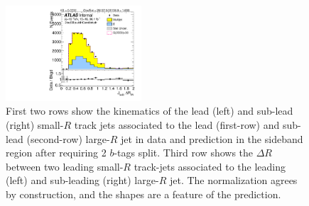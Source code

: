 \begin{figure}[htbp!]
\begin{center}
\includegraphics[angle=270, width=0.45\textwidth]{./figures/boosted/Sideband/b77_TwoTag_split_Sideband_sublHCand_trk_dr.pdf}
  \caption{First two rows show the kinematics of the lead (left) and sub-lead (right) small-$R$ track jets associated to the lead (first-row) and sub-lead (second-row) large-$R$ jet in data and prediction in the sideband region after requiring 2 $b$-tags split. Third row shows the $\Delta R$ between two leading small-$R$ track-jets associated to the leading (left) and sub-leading (right) large-$R$ jet. The normalization agrees by construction, and the shapes are a feature of the prediction. }
  \label{fig:boosted-2bs-sideband-ak2}
\end{center}
\end{figure}


